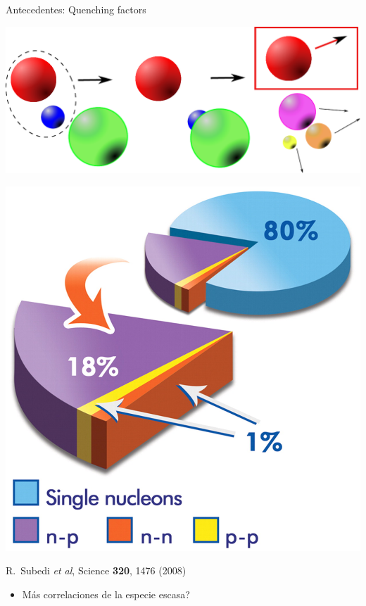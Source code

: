 \documentclass{beamer}
\begin{document}
\begin{frame}{Antecedentes: Quenching factors}
\begin{minipage}{0.45\textwidth}
\begin{center}
  \includegraphics[height=0.3\textheight,width=\textwidth, keepaspectratio]{stripping.pdf}   
    \end{center}
    \end{minipage}
    \begin{minipage}{0.45\textwidth}
    \begin{center}
    \includegraphics[height=0.4\textheight]{subedi.jpeg}
    
    \tiny R.~Subedi \textit{et al}, Science \textbf{320}, 1476 (2008)
    \end{center}
    \end{minipage}
    \begin{itemize}
    \item Más correlaciones de la especie escasa?
    \end{itemize}
    
\end{frame}
\end{document}
